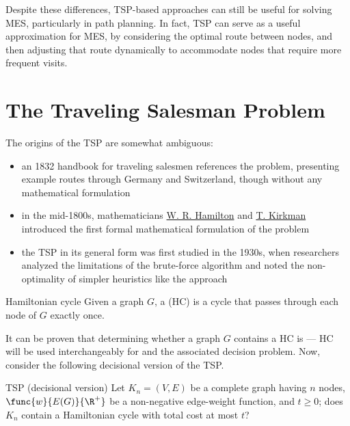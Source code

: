 \documentclass[a4paper, 12pt]{report}
\begin{document}
    Despite these differences, TSP-based approaches can still be useful for solving MES, particularly in path planning. In fact, TSP can serve as a useful approximation for MES, by considering the optimal route between nodes, and then adjusting that route dynamically to accommodate nodes that require more frequent visits.

    \section{The Traveling Salesman Problem}

    The origins of the TSP are somewhat ambiguous:

    \begin{itemize}
        \item an 1832 handbook for traveling salesmen references the problem, presenting example routes through Germany and Switzerland, though without any mathematical formulation
        \item in the mid-1800s, mathematicians \href{https://en.wikipedia.org/wiki/William_Rowan_Hamilton}{W. R. Hamilton} and \href{https://en.wikipedia.org/wiki/Thomas_Kirkman}{T. Kirkman} introduced the first formal mathematical formulation of the problem
        \item the TSP in its general form was first studied in the 1930s, when researchers analyzed the limitations of the brute-force algorithm and noted the non-optimality of simpler heuristics like the  approach
    \end{itemize}

    \begin{frameddefn}{Hamiltonian cycle}
        Given a graph $G$, a  (HC) is a cycle that passes through each node of $G$ exactly once.
    \end{frameddefn}

    It can be proven that determining whether a graph $G$ contains a HC is \NPComplete --- HC will be used interchangeably for  and the associated decision problem. Now, consider the following decisional version of the TSP.

    \begin{frameddefn}{TSP (decisional version)}
        Let $K_n = (V, E)$ be a complete graph having $n$ nodes, $\func{w}{E(G)}{\R^+}$ be a non-negative edge-weight function, and $t \ge 0$; does $K_n$ contain a Hamiltonian cycle with total cost at most $t$?
    \end{frameddefn}
\end{document}
